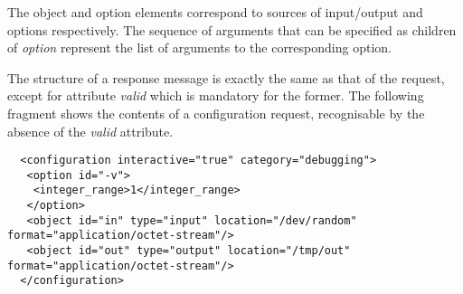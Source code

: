 \documentclass{article}
\begin{document}
   The object and option elements correspond to sources of input/output and
   options respectively. The sequence of arguments that can be specified as
   children of \textit{option} represent the list of arguments to the
   corresponding option.

   The structure of a response message is exactly the same as that of the
   request, except for attribute \textit{valid} which is mandatory for the
   former. The following fragment shows the contents of a configuration
   request, recognisable by the absence of the \textit{valid} attribute.

   \small \begin{verbatim}
  <configuration interactive="true" category="debugging">
   <option id="-v">
    <integer_range>1</integer_range>
   </option>
   <object id="in" type="input" location="/dev/random" format="application/octet-stream"/>
   <object id="out" type="output" location="/tmp/out" format="application/octet-stream"/>
  </configuration>\end{verbatim}
  \normalsize

   
\end{document}
